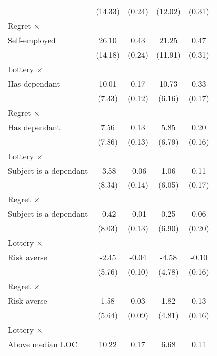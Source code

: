 \begin{table}[htbp]
\begin{tabular}{l*{4}{c}}
                &  (14.33)         &   (0.24)         &  (12.02)         &   (0.31)         \\
\addlinespace
Regret $\times$ \\ Self-employed&    26.10\sym{*}  &     0.43\sym{*}  &    21.25\sym{*}  &     0.47         \\
                &  (14.18)         &   (0.24)         &  (11.91)         &   (0.31)         \\
\addlinespace
Lottery $\times$ \\ Has dependant&    10.01         &     0.17         &    10.73\sym{*}  &     0.33\sym{*}  \\
                &   (7.33)         &   (0.12)         &   (6.16)         &   (0.17)         \\
\addlinespace
Regret $\times$ \\ Has dependant&     7.56         &     0.13         &     5.85         &     0.20         \\
                &   (7.86)         &   (0.13)         &   (6.79)         &   (0.16)         \\
\addlinespace
Lottery $\times$ \\ Subject is a dependant&    -3.58         &    -0.06         &     1.06         &     0.11         \\
                &   (8.34)         &   (0.14)         &   (6.05)         &   (0.17)         \\
\addlinespace
Regret $\times$ \\ Subject is a dependant&    -0.42         &    -0.01         &     0.25         &     0.06         \\
                &   (8.03)         &   (0.13)         &   (6.90)         &   (0.20)         \\
\addlinespace
Lottery $\times$ \\ Risk averse&    -2.45         &    -0.04         &    -4.58         &    -0.10         \\
                &   (5.76)         &   (0.10)         &   (4.78)         &   (0.16)         \\
\addlinespace
Regret $\times$ \\ Risk averse&     1.58         &     0.03         &     1.82         &     0.13         \\
                &   (5.64)         &   (0.09)         &   (4.81)         &   (0.16)         \\
\addlinespace
Lottery $\times$ \\ Above median LOC&    10.22\sym{*}  &     0.17\sym{*}  &     6.68         &     0.11         \\

\end{tabular}
\end{table}
